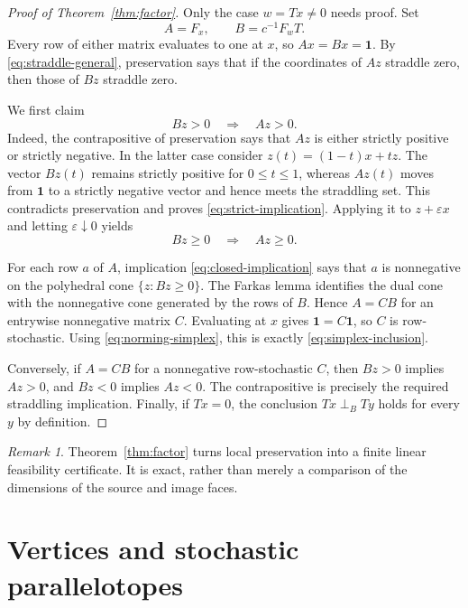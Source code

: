 \documentclass[11pt]{article}
\theoremstyle{definition}
\theoremstyle{remark}
\newtheorem{remark}[theorem]{Remark}
\newcommand{\one}{\mathbf 1}
\newcommand{\perpB}{\perp_B}
\begin{document}
\begin{proof}[Proof of Theorem~\ref{thm:factor}]
Only the case $w=Tx\neq0$ needs proof.  Set
\[
 A=F_x,\qquad B=c^{-1}F_wT.
\]
Every row of either matrix evaluates to one at $x$, so
$Ax=Bx=\one$.  By \eqref{eq:straddle-general}, preservation says that if
the coordinates of $Az$ straddle zero, then those of $Bz$ straddle zero.

We first claim
\begin{equation}\label{eq:strict-implication}
 Bz>0\quad\Longrightarrow\quad Az>0.
\end{equation}
Indeed, the contrapositive of preservation says that $Az$ is either strictly
positive or strictly negative.  In the latter case consider
$z(t)=(1-t)x+tz$.  The vector $Bz(t)$ remains strictly positive for
$0\leq t\leq1$, whereas $Az(t)$ moves from $\one$ to a strictly negative
vector and hence meets the straddling set.  This contradicts preservation
and proves \eqref{eq:strict-implication}.  Applying it to
$z+\varepsilon x$ and letting $\varepsilon\downarrow0$ yields
\begin{equation}\label{eq:closed-implication}
 Bz\geq0\quad\Longrightarrow\quad Az\geq0.
\end{equation}

For each row $a$ of $A$, implication \eqref{eq:closed-implication} says that
$a$ is nonnegative on the polyhedral cone $\{z:Bz\geq0\}$.  The Farkas
lemma identifies the dual cone with the nonnegative cone generated by the
rows of $B$.  Hence $A=CB$ for an entrywise nonnegative matrix $C$.
Evaluating at $x$ gives $\one=C\one$, so $C$ is row-stochastic.  Using
\eqref{eq:norming-simplex}, this is exactly
\eqref{eq:simplex-inclusion}.

Conversely, if $A=CB$ for a nonnegative row-stochastic $C$, then $Bz>0$
implies $Az>0$, and $Bz<0$ implies $Az<0$.  The contrapositive is precisely
the required straddling implication.  Finally, if $Tx=0$, the conclusion
$Tx\perpB Ty$ holds for every $y$ by definition.
\end{proof}

\begin{remark}
Theorem~\ref{thm:factor} turns local preservation into a finite linear
feasibility certificate.  It is exact, rather than merely a comparison of
the dimensions of the source and image faces.
\end{remark}

\section{Vertices and stochastic parallelotopes}
\end{document}
